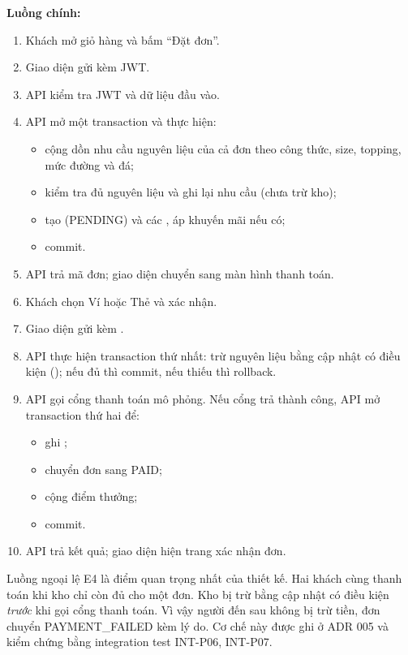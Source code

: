 \textbf{Luồng chính:}
\begin{enumerate}
\item Khách mở giỏ hàng và bấm ``Đặt đơn''.
\item Giao diện gửi  kèm JWT.
\item API kiểm tra JWT và dữ liệu đầu vào.
\item API mở một transaction và thực hiện:
  \begin{itemize}
  \item cộng dồn nhu cầu nguyên liệu của cả đơn theo công thức, size, topping, mức đường và đá;
  \item kiểm tra đủ nguyên liệu và ghi lại nhu cầu (chưa trừ kho);
  \item tạo  (PENDING) và các , áp khuyến mãi nếu có;
  \item commit.
  \end{itemize}
\item API trả mã đơn; giao diện chuyển sang màn hình thanh toán.
\item Khách chọn Ví hoặc Thẻ và xác nhận.
\item Giao diện gửi  kèm .
\item API thực hiện transaction thứ nhất: trừ nguyên liệu bằng cập nhật có điều kiện (); nếu đủ thì commit, nếu thiếu thì rollback.
\item API gọi cổng thanh toán mô phỏng. Nếu cổng trả thành công, API mở transaction thứ hai để:
  \begin{itemize}
  \item ghi ;
  \item chuyển đơn sang PAID;
  \item cộng điểm thưởng;
  \item commit.
  \end{itemize}
\item API trả kết quả; giao diện hiện trang xác nhận đơn.
\end{enumerate}




Luồng ngoại lệ E4 là điểm quan trọng nhất của thiết kế. Hai khách cùng thanh toán khi kho chỉ còn đủ cho một đơn. Kho bị trừ bằng cập nhật có điều kiện \emph{trước} khi gọi cổng thanh toán. Vì vậy người đến sau không bị trừ tiền, đơn chuyển PAYMENT\_FAILED kèm lý do. Cơ chế này được ghi ở ADR 005 và kiểm chứng bằng integration test INT-P06, INT-P07.
